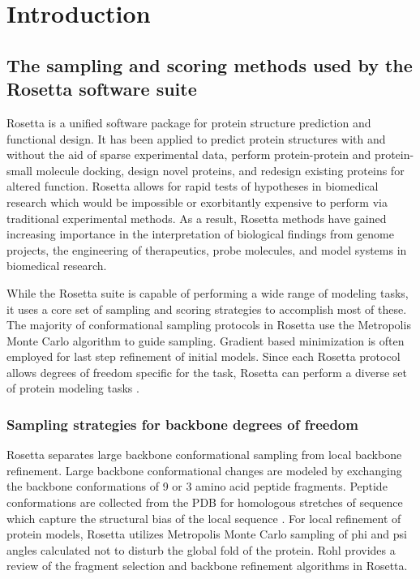 \chapter{Introduction}
\section{The sampling and scoring methods used by the Rosetta software suite}
Rosetta is a unified software package for protein structure prediction and functional design.
It has been applied to predict protein structures with and without the aid of sparse experimental data, perform protein-protein and protein-small molecule docking, design novel proteins, and redesign existing proteins for altered function.
Rosetta allows for rapid tests of hypotheses in biomedical research which would be impossible or exorbitantly expensive to perform via traditional experimental methods.
As a result, Rosetta methods have gained increasing importance in the interpretation of biological findings from genome projects, the engineering of therapeutics, probe molecules, and model systems in biomedical research. 

While the Rosetta suite is capable of performing a wide range of modeling tasks, it uses a core set of sampling and scoring strategies to accomplish most of these. 
The majority of conformational sampling protocols in Rosetta use the Metropolis Monte Carlo algorithm to guide sampling.
Gradient based minimization is often employed for last step refinement of initial models.
Since each Rosetta protocol allows degrees of freedom specific for the task, Rosetta can perform a diverse set of protein modeling tasks  \citep{Wang:2007du}.

\subsection{Sampling strategies for backbone degrees of freedom}
Rosetta separates large backbone conformational sampling from local backbone refinement.
Large backbone conformational changes are modeled by exchanging the backbone conformations of 9 or 3 amino acid peptide fragments.
Peptide conformations are collected from the \ac{PDB} for homologous stretches of sequence  \citep{Simons:1997do} which capture the structural bias of the local sequence  \citep{Bystroff:1996vl}.
For local refinement of protein models, Rosetta utilizes Metropolis Monte Carlo sampling of phi and psi angles calculated not to disturb the global fold of the protein.
Rohl  \citep{Rohl:2004dh} provides a review of the fragment selection and backbone refinement algorithms in Rosetta. 

